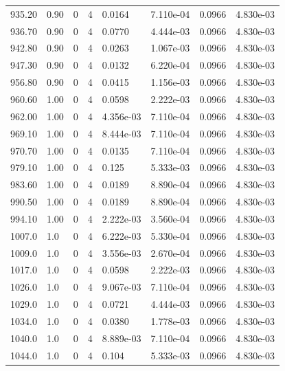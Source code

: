 \documentclass[preview]{standalone}
\begin{document}
{{{{{{\begin{tabular}{L{1.2cm}C{1.2cm} C{0.3cm}C{0.5cm} C{1.4cm}C{1.4cm} C{1.4cm}C{1.4cm}}
  935.20  &  0.90  & 0     &  4 &  0.0164  & 7.110e-04  & 0.0966 &  4.830e-03   \\ 
  936.70  &  0.90  & 0     &  4 &  0.0770  & 4.444e-03  & 0.0966 &  4.830e-03   \\ 
  942.80  &  0.90  & 0     &  4 &  0.0263  & 1.067e-03  & 0.0966 &  4.830e-03   \\ 
  947.30  &  0.90  & 0     &  4 &  0.0132  & 6.220e-04  & 0.0966 &  4.830e-03   \\ 
  956.80  &  0.90  & 0     &  4 &  0.0415  & 1.156e-03  & 0.0966 &  4.830e-03   \\ 
  960.60  &  1.00  & 0     &  4 &  0.0598  & 2.222e-03  & 0.0966 &  4.830e-03   \\ 
  962.00  &  1.00  & 0     &  4 &  4.356e-03  & 7.110e-04  & 0.0966 &  4.830e-03   \\ 
  969.10  &  1.00  & 0     &  4 &  8.444e-03  & 7.110e-04  & 0.0966 &  4.830e-03   \\ 
  970.70  &  1.00  & 0     &  4 &  0.0135  & 7.110e-04  & 0.0966 &  4.830e-03   \\ 
  979.10  &  1.00  & 0     &  4 &  0.125  & 5.333e-03  & 0.0966 &  4.830e-03   \\ 
  983.60  &  1.00  & 0     &  4 &  0.0189  & 8.890e-04  & 0.0966 &  4.830e-03   \\ 
  990.50  &  1.00  & 0     &  4 &  0.0189  & 8.890e-04  & 0.0966 &  4.830e-03   \\ 
  994.10  &  1.00  & 0     &  4 &  2.222e-03  & 3.560e-04  & 0.0966 &  4.830e-03   \\ 
  1007.0  &   1.0  & 0     &  4 &  6.222e-03  & 5.330e-04  & 0.0966 &  4.830e-03   \\ 
  1009.0  &   1.0  & 0     &  4 &  3.556e-03  & 2.670e-04  & 0.0966 &  4.830e-03   \\ 
  1017.0  &   1.0  & 0     &  4 &  0.0598  & 2.222e-03  & 0.0966 &  4.830e-03   \\ 
  1026.0  &   1.0  & 0     &  4 &  9.067e-03  & 7.110e-04  & 0.0966 &  4.830e-03   \\ 
  1029.0  &   1.0  & 0     &  4 &  0.0721  & 4.444e-03  & 0.0966 &  4.830e-03   \\ 
  1034.0  &   1.0  & 0     &  4 &  0.0380  & 1.778e-03  & 0.0966 &  4.830e-03   \\ 
  1040.0  &   1.0  & 0     &  4 &  8.889e-03  & 7.110e-04  & 0.0966 &  4.830e-03   \\ 
  1044.0  &   1.0  & 0     &  4 &  0.104  & 5.333e-03  & 0.0966 &  4.830e-03   \\ 

\end{tabular}}}}}}}
\end{document}
